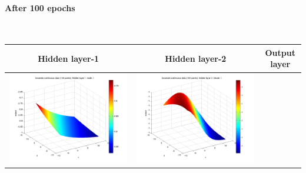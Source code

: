 \documentclass[fleqn]{article}
\newcommand{\myparagraph}[1]{\paragraph{#1}\mbox{}\\}
\begin{document}
\myparagraph{After 100 epochs}
\begin{center}
  \begin{longtable}{ c | c | r }
	\multicolumn{1}{c}{Hidden layer-1 } & 
	\multicolumn{1}{c}{Hidden layer-2 } & 
	\multicolumn{1}{c}{Output layer} \\
    \hline
    \includegraphics[scale=0.25]{./pics/bivariate100/_2_4/_2_4_epoch_100_hidden layer 1 :1}  &  \includegraphics[scale=0.25]{./pics/bivariate100/_2_4/_2_4_epoch_100_hidden layer 2 :21} &  \\ 

\end{longtable}
\end{center}
\end{document}

